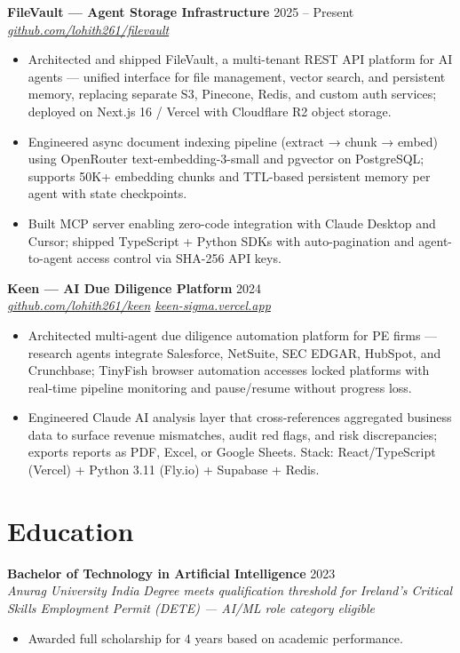 \documentclass[10pt,letterpaper]{article}
\newcommand{\entry}[3]{%
  \vspace{3pt}\textbf{#1} \hfill #3 \\
  \textit{\small #2}\vspace{1pt}}
\begin{document}
\entry{FileVault --- Agent Storage Infrastructure}{\href{https://github.com/lohith261/filevault}{github.com/lohith261/filevault}}{2025 -- Present}
\begin{itemize}
  \item Architected and shipped FileVault, a multi-tenant REST API platform for AI agents --- unified interface for file management, vector search, and persistent memory, replacing separate S3, Pinecone, Redis, and custom auth services; deployed on Next.js 16 / Vercel with Cloudflare R2 object storage.
  \item Engineered async document indexing pipeline (extract → chunk → embed) using OpenRouter text-embedding-3-small and pgvector on PostgreSQL; supports 50K+ embedding chunks and TTL-based persistent memory per agent with state checkpoints.
  \item Built MCP server enabling zero-code integration with Claude Desktop and Cursor; shipped TypeScript + Python SDKs with auto-pagination and agent-to-agent access control via SHA-256 API keys.
\end{itemize}

\entry{Keen --- AI Due Diligence Platform}{\href{https://github.com/lohith261/keen}{github.com/lohith261/keen} \quad\textbullet\quad \href{https://keen-sigma.vercel.app/}{keen-sigma.vercel.app}}{2024}
\begin{itemize}
  \item Architected multi-agent due diligence automation platform for PE firms --- research agents integrate Salesforce, NetSuite, SEC EDGAR, HubSpot, and Crunchbase; TinyFish browser automation accesses locked platforms with real-time pipeline monitoring and pause/resume without progress loss.
  \item Engineered Claude AI analysis layer that cross-references aggregated business data to surface revenue mismatches, audit red flags, and risk discrepancies; exports reports as PDF, Excel, or Google Sheets. Stack: React/TypeScript (Vercel) + Python 3.11 (Fly.io) + Supabase + Redis.
\end{itemize}

\section{Education}

\entry{Bachelor of Technology in Artificial Intelligence}{Anurag University \textbullet{} India}{2023}
\newline\textit{\small Degree meets qualification threshold for Ireland's Critical Skills Employment Permit (DETE) --- AI/ML role category eligible}
\begin{itemize}
  \item Awarded full scholarship for 4 years based on academic performance.
\end{itemize}
\end{document}
